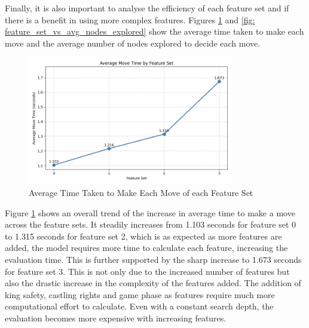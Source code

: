Finally, it is also important to analyse the efficiency of each feature set and if there is a benefit in using more complex features. Figures \ref{fig: feature_set_vs_avg_move_time} and \ref{fig: feature_set_vs_avg_nodes_explored} show the average time taken to make each move and the average number of nodes explored to decide each move.





\begin{figure}[H]
    \centering
    \includegraphics[width=0.8\textwidth]{images/plots/featureSet/Feature_set_vs_avg_move_time.png}
    \caption{Average Time Taken to Make Each Move of each Feature Set}
    \label{fig: feature_set_vs_avg_move_time} 
\end{figure}

Figure \ref{fig: feature_set_vs_avg_move_time} shows an overall trend of the increase in average time to make a move across the feature sets. It steadily increases from 1.103 seconds for feature set 0 to 1.315 seconds for feature set 2, which is as expected as more features are added, the model requires more time to calculate each feature, increasing the evaluation time. This is further supported by the sharp increase to 1.673 seconds for feature set 3. This is not only due to the increased number of features but also the drastic increase in the complexity of the features added. The addition of king safety, castling rights and game phase as features require much more computational effort to calculate. Even with a constant search depth, the evaluation becomes more expensive with increasing features. 


